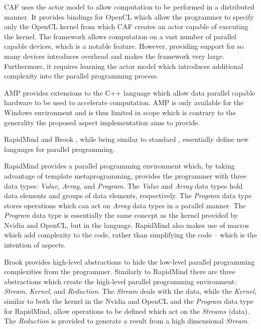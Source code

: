 \documentclass{sig-alternate-05-2015}
\begin{document}
CAF \cite{schmidt:actor, schmidt:actor1} uses the actor model to allow
computation to be performed in a distributed manner. It provides bindings for
OpenCL which allow the programmer to specify only the OpenCL kernel from which
CAF creates an actor capable of executing the kernel. The framework allows
computation on a vast number of parallel capable devices, which is a notable
feature. However, providing support for so many devices introduces overhead and makes 
the framework very large. Furthermore, it requires learning the actor model 
which introduces additional complexity into the parallel programming process.

\CPP AMP \cite{microsoft:amp} provides extensions to the C++ language which allow 
data parallel capable hardware to be used to accelerate computation. \CPP AMP is 
only available for the Windows environment and is thus limited in scope which is
contrary to the generality the proposed aspect implementation aims to provide.

RapidMind \cite{rapidmind} and Brook \cite{brook}, while being similar to standard
\CPP, essentially define new languages for parallel programming.

RapidMind provides a parallel programming environment which, by
taking advantage of \CPP template metaprogramming, provides the programmer 
with three data types: \textit{Value}, \textit{Array}, and \textit{Program}.
The \textit{Value} and \textit{Array} data types hold data elements and 
groups of data elements, respectively. The \textit{Program} data type stores
operations which can act on \textit{Array} data types in a parallel manner.
The \textit{Program} data type is essentially the same concept as the kernel 
provided  by Nvidia and OpenCL, but in the \CPP language. RapidMind also makes 
use of macros which add complexity to the code, rather than simplifying the code
-- which is the intention of aspects.

Brook provides high-level abstractions to hide the low-level parallel
programming complexities from the programmer. Similarly to RapidMind there 
are three abstractions which create the high-level parallel programming 
environment: \textit{Stream}, \textit{Kernel}, and \textit{Reduction}. The 
\textit{Stream} deals with the data, while the \textit{Kernel}, similar to both 
the kernel in the Nvidia and OpenCL and the \textit{Program} data type for 
RapidMind, allow operations to be defined which act on the \textit{Streams} (data). 
The \textit{Reduction} is provided to generate a result from a high dimensional 
\textit{Stream}.
\end{document}
